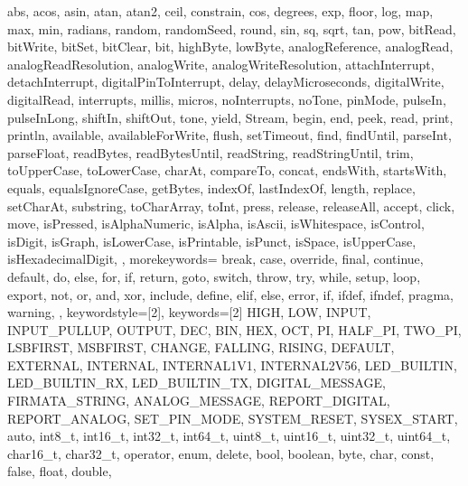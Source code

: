 {{                abs, acos, asin, atan, atan2, ceil, constrain, cos, degrees, exp, 
                floor, log, map, max, min, radians, random, randomSeed, round, sin, 
                sq, sqrt, tan, pow, bitRead, bitWrite, bitSet, bitClear, bit, 
                highByte, lowByte, analogReference, analogRead, 
                analogReadResolution, analogWrite, analogWriteResolution, 
                attachInterrupt, detachInterrupt, digitalPinToInterrupt, delay, 
                delayMicroseconds, digitalWrite, digitalRead, interrupts, millis, 
                micros, noInterrupts, noTone, pinMode, pulseIn, pulseInLong, shiftIn, 
                shiftOut, tone, yield, Stream, begin, end, peek, read, print, 
                println, available, availableForWrite, flush, setTimeout, find, 
                findUntil, parseInt, parseFloat, readBytes, readBytesUntil, readString, 
                readStringUntil, trim, toUpperCase, toLowerCase, charAt, compareTo, 
                concat, endsWith, startsWith, equals, equalsIgnoreCase, getBytes, 
                indexOf, lastIndexOf, length, replace, setCharAt, substring, 
                toCharArray, toInt, press, release, releaseAll, accept, click, move, 
                isPressed, isAlphaNumeric, isAlpha, isAscii, isWhitespace, isControl, 
                isDigit, isGraph, isLowerCase, isPrintable, isPunct, isSpace, 
                isUpperCase, isHexadecimalDigit, 
                }, 
  morekeywords={   %
                break, case, override, final, continue, default, do, else, for, 
                if, return, goto, switch, throw, try, while, setup, loop, export, 
                not, or, and, xor, include, define, elif, else, error, if, ifdef, 
                ifndef, pragma, warning,
                }, 
% 
%
  keywordstyle=[2]\color{arduinoBlue},   
  keywords=[2]{   %
                HIGH, LOW, INPUT, INPUT_PULLUP, OUTPUT, DEC, BIN, HEX, OCT, PI, 
                HALF_PI, TWO_PI, LSBFIRST, MSBFIRST, CHANGE, FALLING, RISING, 
                DEFAULT, EXTERNAL, INTERNAL, INTERNAL1V1, INTERNAL2V56, LED_BUILTIN, 
                LED_BUILTIN_RX, LED_BUILTIN_TX, DIGITAL_MESSAGE, FIRMATA_STRING, 
                ANALOG_MESSAGE, REPORT_DIGITAL, REPORT_ANALOG, SET_PIN_MODE, 
                SYSTEM_RESET, SYSEX_START, auto, int8_t, int16_t, int32_t, int64_t, 
                uint8_t, uint16_t, uint32_t, uint64_t, char16_t, char32_t, operator, 
                enum, delete, bool, boolean, byte, char, const, false, float, double, 
}}
